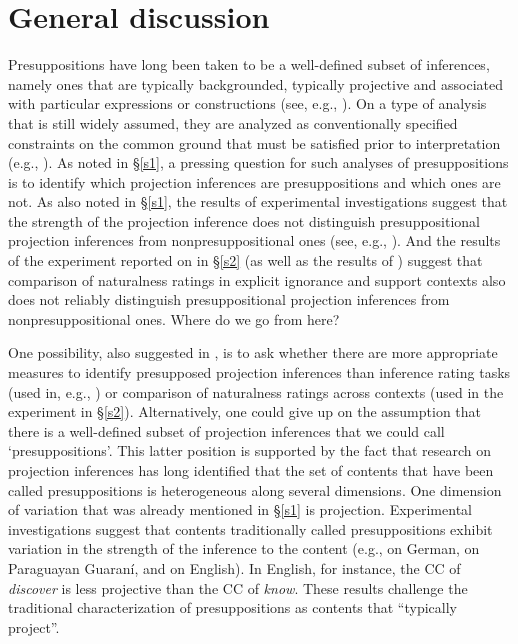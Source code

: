 \documentclass[11pt,fleqn]{article}
\newcommand{\6}{\mbox{$[\hspace*{-.6mm}[$}}
\newcommand{\9}{\mbox{$]\hspace*{-.6mm}]$}}
\begin{document}
  
\section{General discussion}\label{s3}

Presuppositions have long been taken to be a well-defined subset of inferences, namely ones that are typically backgrounded, typically projective and associated with particular expressions or constructions (see, e.g., \citealt{potts05,presupposition-sep}). On a type of analysis that is still widely assumed, they are analyzed as conventionally specified constraints on the common ground that must be satisfied prior to interpretation (e.g., \citealt{heim83,vds92}). As noted in \S\ref{s1}, a pressing question for such analyses of presuppositions is to identify which projection inferences are presuppositions and which ones are not. As also noted in \S\ref{s1}, the results of experimental investigations suggest that the strength of the projection inference does not distinguish presuppositional projection inferences from nonpresuppositional ones (see, e.g., \citealt{demarneffe-etal-sub23,degen-tonhauser-language}). And the results of the experiment reported on in \S\ref{s2} (as well as the results of \citealt[Exp.~1]{kalomoiros-schwarz2024}) suggest that comparison of naturalness ratings in explicit ignorance and support contexts also does not reliably distinguish presuppositional projection inferences from nonpresuppositional ones. Where do we go from here?

One possibility, also suggested in \citealt[\S4]{degen-tonhauser-language}, is to ask whether there are more appropriate measures to identify presupposed projection inferences than inference rating tasks (used in, e.g., \citealt{degen-tonhauser-language}) or comparison of naturalness ratings across contexts (used in the experiment in \S\ref{s2}). Alternatively, one could give up on the assumption that there is a well-defined subset of projection inferences that we could call `presuppositions'. This latter position is supported by the fact that research on projection inferences has long identified that the set of contents that have been called presuppositions is heterogeneous along several dimensions. One dimension of variation that was already mentioned in \S\ref{s1} is projection. Experimental investigations suggest that contents traditionally called presuppositions exhibit variation in the strength of the inference to the content (e.g., \citealt{xue-onea11} on German, \citealt{tonhauser-guarani-variability} on Paraguayan Guaran\'i, and \citealt{demarneffe-etal-sub23,tbd-variability,degen-tonhauser-language} on English). In English, for instance, the CC of {\em discover} is less projective than the CC of {\em know}. These results challenge the traditional characterization of presuppositions as contents that ``typically project''.
\end{document}
